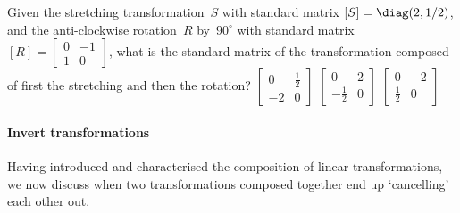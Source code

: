 \begin{activity}
Given the stretching transformation~\(S\) with standard matrix \([S]=\diag(2,1/2)\), and the anti-clockwise rotation~\(R\) by~\(90^\circ\) with standard matrix \([R]=\begin{bmatrix} 0&-1\\1&0 \end{bmatrix}\), what is the standard matrix of the transformation composed of first the stretching and then the rotation?
{\(\begin{bmatrix} 0&\tfrac12\\-2&0 \end{bmatrix}\)}
{\(\begin{bmatrix} 0&2\\-\tfrac12&0 \end{bmatrix}\)}
{\(\begin{bmatrix} 0&-2\\\tfrac12&0 \end{bmatrix}\)}
\end{activity}




\paragraph{Invert transformations}
Having introduced and characterised the composition of linear transformations, we now discuss when two transformations composed together end up `cancelling' each other out.

